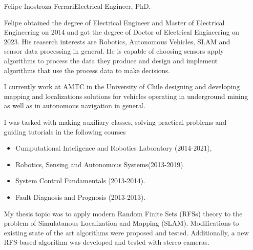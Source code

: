 \documentclass{article}
\begin{document}
\begin{cv}[avatar]{Felipe Inostroza Ferrari}{Electrical Engineer, PhD.}



Felipe obtained the degree of Electrical Engineer and Master of Electrical Engineering on 2014  and got the degree of Doctor of Electrical Engineering on 2023. His reaserch interests are Robotics, Autonomous Vehicles, SLAM and sensor data processing in general. 
He is capable of choosing sensors apply algorithms to process the data they produce and design and implement algorithms that use the process data to make decisions.  


\begin{cvevent}[2019][present]
    I currently work at AMTC in the University of Chile designing and developing mapping and localizations solutions for vehicles operating in underground mining as well as in autonomous navigation in general.  
\end{cvevent}

\begin{cvevent}[2014][2021]
    I was tasked with making auxiliary classes, solving practical problems and guiding tutorials in the following courses
    \begin{itemize}
        \item Cumputational Inteligence and Robotics Laboratory (2014-2021),
        \item Robotics, Sensing and Autonomous Systems(2013-2019).
        \item System Control Fundamentals (2013-2014).
        \item Fault Diagnosis and Prognosis (2013-2013).
    \end{itemize}
\end{cvevent}



\begin{cvevent}[2014][2023]
My thesis topic was to apply modern Random Finite Sets (RFSs) theory to the problem of Simulatanous Localization and Mapping (SLAM). Modifications to existing state of the art algorithms were proposed and tested. Additionally, a new RFS-based algorithm was developed and tested with stereo cameras.
\end{cvevent}


\end{cv}
\end{document}
